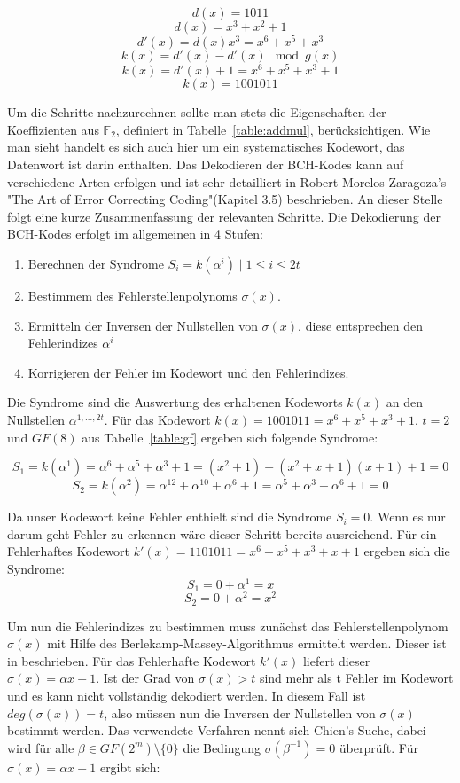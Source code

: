 $$d(x) = 1011$$
$$d(x) = x^3 + x^2 + 1$$
$$d'(x) = d(x)x^3 = x^6 + x^5 + x^3$$
$$k(x) = d'(x) - d'(x) \mod g(x)$$
$$k(x) = d'(x) + 1 = x^6 + x^5 + x^3 + 1$$
$$k(x) = 1001011$$

Um die Schritte nachzurechnen sollte man stets die Eigenschaften der Koeffizienten aus $\mathbb{F}_2$, definiert in Tabelle~\ref{table:addmul}, berücksichtigen.
Wie man sieht handelt es sich auch hier um ein systematisches Kodewort, das Datenwort ist darin enthalten.
\newblock
\newline
Das Dekodieren der BCH-Kodes kann auf verschiedene Arten erfolgen und ist sehr detailliert in Robert Morelos-Zaragoza's "The Art of Error Correcting Coding"(Kapitel 3.5) beschrieben.\cite{morelos2006art}
An dieser Stelle folgt eine kurze Zusammenfassung der relevanten Schritte.
Die Dekodierung der BCH-Kodes erfolgt im allgemeinen in 4 Stufen:

\begin{enumerate}
\item Berechnen der Syndrome $S_i = k(\alpha^i) \mid 1 \leq i \leq 2t$
\item Bestimmem des Fehlerstellenpolynoms $\sigma(x)$.
\item Ermitteln der Inversen der Nullstellen von $\sigma(x)$, diese entsprechen den Fehlerindizes $\alpha^i$
\item Korrigieren der Fehler im Kodewort und den Fehlerindizes.
\end{enumerate}

Die Syndrome sind die Auswertung des erhaltenen Kodeworts $k(x)$ an den Nullstellen $\alpha^{1,...,2t}$. 
Für das Kodewort $k(x) = 1001011 = x^6 + x^5 + x^3 + 1$, $t=2$ und $GF(8)$ aus Tabelle~\ref{table:gf} ergeben sich folgende Syndrome:

$$S_1 = k(\alpha^1) = \alpha^6 + \alpha^5 + \alpha^3 + 1 = (x^2 +1) + (x^2+x+1)(x+1)+1 = 0$$
$$S_2 = k(\alpha^2) = \alpha^{12} + \alpha^{10} + \alpha^6 + 1 = \alpha^5 + \alpha^3 + \alpha^6 + 1 = 0 $$

Da unser Kodewort keine Fehler enthielt sind die Syndrome $S_i = 0$. Wenn es nur darum geht Fehler zu erkennen wäre dieser Schritt bereits ausreichend. Für ein Fehlerhaftes Kodewort $k'(x) = 1101011 = x^6 + x^5 + x^3 + x+1$ ergeben sich die Syndrome: 
$$S_1 = 0 + \alpha^1 = x$$
$$S_2 = 0 + \alpha^2 = x^2$$

Um nun die Fehlerindizes zu bestimmen muss zunächst das Fehlerstellenpolynom $\sigma(x)$ mit Hilfe des Berlekamp-Massey-Algorithmus ermittelt werden. Dieser ist in \cite[Kap 3.5.2]{morelos2006art} beschrieben. Für das Fehlerhafte Kodewort $k'(x)$ liefert dieser $\sigma(x) = \alpha x +1$. Ist der Grad von $\sigma(x) > t$ sind mehr als t Fehler im Kodewort und es kann nicht vollständig dekodiert werden. In diesem Fall ist $deg(\sigma(x)) = t$, also müssen nun die Inversen der Nullstellen von $\sigma(x)$ bestimmt werden. Das verwendete Verfahren nennt sich Chien's Suche, dabei wird für alle $\beta \in GF(2^m)\setminus\{0\}$ die Bedingung $\sigma(\beta^{-1}) = 0$ überprüft.\cite[Kap. 3.5.5]{morelos2006art} Für $\sigma(x) = \alpha x +1$ ergibt sich:

